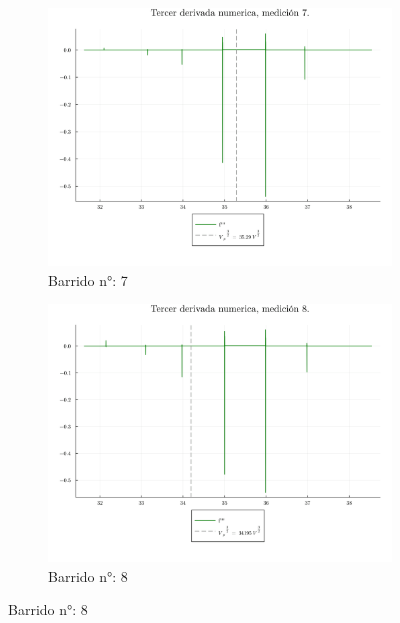 \begin{figure}[H]
	\ContinuedFloat %
	\centering
	\begin{subfigure}[b]{0.49\textwidth}
		\centering
		\includegraphics[width=\linewidth]{img/potderst7.png}
		\caption{Barrido n°: 7}
		\label{fig:potderst7}
	\end{subfigure}
	\hfill
	\begin{subfigure}[b]{0.49\textwidth}
		\centering
		\includegraphics[width=\linewidth]{img/potderst8.png}
		\caption{Barrido n°: 8}
		\label{fig:potderst8}
	\end{subfigure}
\end{figure}


